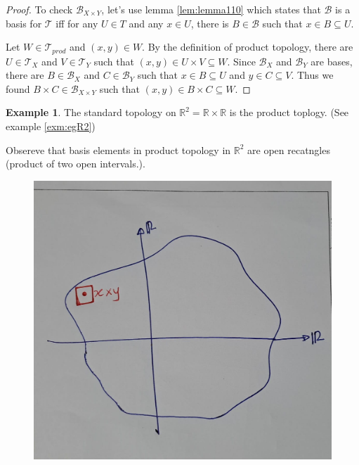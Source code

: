 \documentclass[
]{book}
\theoremstyle{definition}
\theoremstyle{definition}
\newtheorem{example}{Example}[chapter]
\theoremstyle{definition}
\theoremstyle{definition}
\theoremstyle{remark}
\begin{document}
\begin{proof}
To check \(\mathcal{B}_{X \times Y}\), let's use lemma \ref{lem:lemma110} which states that \(\mathcal{B}\) is a basis for \(\mathcal{T}\) iff for any \(U \in T\) and any \(x \in U\), there is \(B \in \mathcal{B}\) such that \(x \in B \subseteq U\).

Let \(W \in \mathcal{T}_{prod}\) and \((x, y) \in W\). By the definition of product topology, there are \(U \in \mathcal{T}_X\) and \(V \in \mathcal{T}_Y\) such that \((x,y) \in U \times V \subseteq W\). Since \(\mathcal{B}_X\) and \(\mathcal{B}_Y\) are bases, there are \(B \in \mathcal{B}_X\) and \(C \in \mathcal{B}_Y\) such that \(x \in B \subseteq U\) and \(y \in C \subseteq V\). Thus we found \(B \times C \in \mathcal{B}_{X \times Y}\) such that \((x,y) \in B \times C \subseteq W\).
\end{proof}

\begin{example}
\protect\hypertarget{exm:unnamed-chunk-38}{}\label{exm:unnamed-chunk-38}The standard topology on \(\mathbb{R}^2=\mathbb{R}\times\mathbb{R}\) is the product toplogy. (See example \ref{exm:egR2})

Obsereve that basis elements in product topology in \(\mathbb{R}^2\) are open recatngles (product of two open intervals.).
\end{example}

\begin{figure}
\centering
\includegraphics{figures/figure 10.jpg}
\caption{\label{fig:fig10}\(~\)}
\end{figure}
\end{document}
